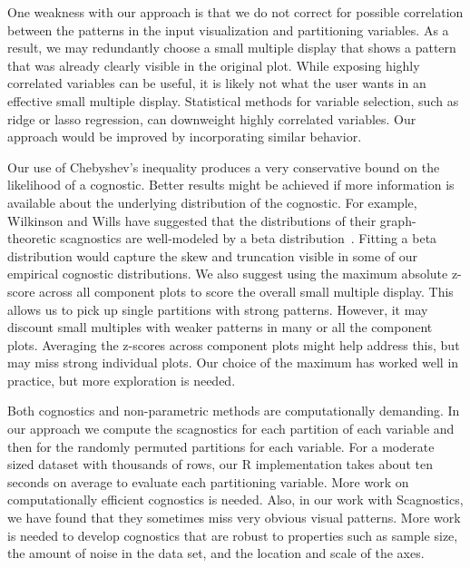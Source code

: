 One weakness with our approach is that we do not correct for possible correlation between the patterns in the input visualization and partitioning variables. As a result, we may redundantly choose a small multiple display that shows a pattern that was already clearly visible in the original plot. While exposing highly correlated variables can be useful, it is likely not what the user wants in an effective small multiple display. Statistical methods for variable selection, such as ridge or lasso regression, can downweight highly correlated variables. Our approach would be improved by incorporating similar behavior. 

Our use of Chebyshev's inequality produces a very conservative bound on the likelihood of a cognostic. Better results might be achieved if more information is available about the underlying distribution of the cognostic. For example, Wilkinson and Wills have suggested that the distributions of their graph-theoretic scagnostics are well-modeled by a beta distribution~\cite{Wilkinson2008}. Fitting a beta distribution would capture the skew and truncation visible in some of our empirical cognostic distributions. We also suggest using the maximum absolute z-score across all component plots to score the overall small multiple display. This allows us to pick up single partitions with strong patterns. However, it may discount small multiples with weaker patterns in many or all the component plots. Averaging the z-scores across component plots might help address this, but may miss strong individual plots. Our choice of the maximum has worked well in practice, but more exploration is needed. 

Both cognostics and non-parametric methods are computationally demanding. In our approach we compute the scagnostics for each partition of each variable and then for the randomly permuted partitions for each variable. For a moderate sized dataset with thousands of rows, our R implementation takes about ten seconds on average to evaluate each partitioning variable. More work on computationally efficient cognostics is needed. Also, in our work with Scagnostics, we have found that they sometimes miss very obvious visual patterns. More work is needed to develop cognostics that are robust to properties such as sample size, the amount of noise in the data set, and the location and scale of the axes. 
